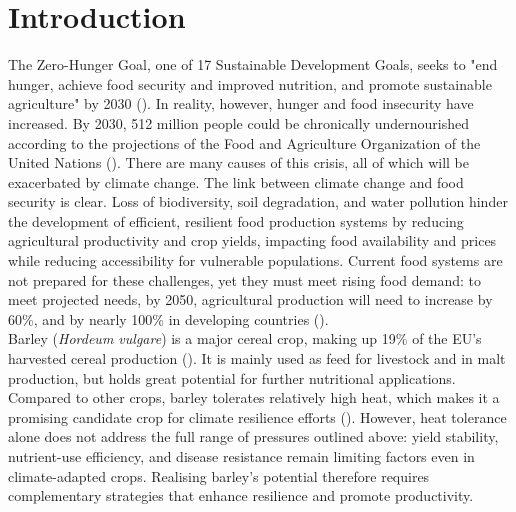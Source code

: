 \chapter{Introduction}

The Zero-Hunger Goal, one of 17 Sustainable Development Goals, seeks to "end hunger, achieve food security and improved nutrition, and promote sustainable agriculture" by 2030 (\cite{united_nations_transforming_2015}). In reality, however, hunger and food insecurity have increased. By 2030, 512 million people could be chronically undernourished according to the projections of the Food and Agriculture Organization of the United Nations (\cite{noauthor_state_2026}). There are many causes of this crisis, all of which will be exacerbated by climate change. The link between climate change and food security is clear. Loss of biodiversity, soil degradation, and water pollution hinder the development of efficient, resilient food production systems by reducing agricultural productivity and crop yields, impacting food availability and prices while reducing accessibility for vulnerable populations. Current food systems are not prepared for these challenges, yet they must meet rising food demand: to meet projected needs, by 2050, agricultural production will need to increase by 60\%, and by nearly 100\% in developing countries (\cite{leal_filho_sustainable_2022}).
\\


Barley (\textit{Hordeum vulgare}) is a major cereal crop, making up 19\% of the EU’s harvested cereal production (\cite{european_commission_agricultural_2025}). It is mainly used as feed for livestock and in malt production, but holds great potential for further nutritional applications. Compared to other crops, barley tolerates relatively high heat, which makes it a promising candidate crop for climate resilience efforts (\cite{soare_survey_2023}). However, heat tolerance alone does not address the full range of pressures outlined above: yield stability, nutrient-use efficiency, and disease resistance remain limiting factors even in climate-adapted crops. Realising barley's potential therefore requires complementary strategies that enhance resilience and promote productivity.
\\


